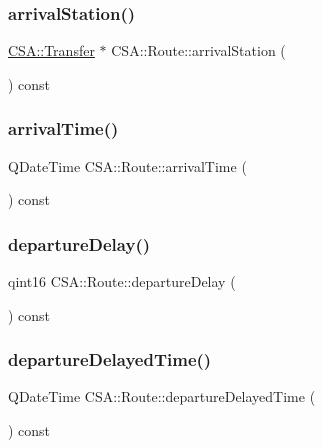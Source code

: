 \subsubsection{\texorpdfstring{arrival\+Station()}{arrivalStation()}}
{\footnotesize\ttfamily \mbox{\hyperlink{classCSA_1_1Transfer}{C\+S\+A\+::\+Transfer}} $\ast$ C\+S\+A\+::\+Route\+::arrival\+Station (\begin{DoxyParamCaption}{ }\end{DoxyParamCaption}) const}

\mbox{\label{classCSA_1_1Route_a29727ecadd5b223b2c34dfe79ae4219a}} 
\subsubsection{\texorpdfstring{arrival\+Time()}{arrivalTime()}}
{\footnotesize\ttfamily Q\+Date\+Time C\+S\+A\+::\+Route\+::arrival\+Time (\begin{DoxyParamCaption}{ }\end{DoxyParamCaption}) const}

\mbox{\label{classCSA_1_1Route_a8773b1afb576a67ba7a76e010aeca537}} 
\subsubsection{\texorpdfstring{departure\+Delay()}{departureDelay()}}
{\footnotesize\ttfamily qint16 C\+S\+A\+::\+Route\+::departure\+Delay (\begin{DoxyParamCaption}{ }\end{DoxyParamCaption}) const}

\mbox{\label{classCSA_1_1Route_a24964759b1d391a4bb45c7e40daed095}} 
\subsubsection{\texorpdfstring{departure\+Delayed\+Time()}{departureDelayedTime()}}
{\footnotesize\ttfamily Q\+Date\+Time C\+S\+A\+::\+Route\+::departure\+Delayed\+Time (\begin{DoxyParamCaption}{ }\end{DoxyParamCaption}) const}

